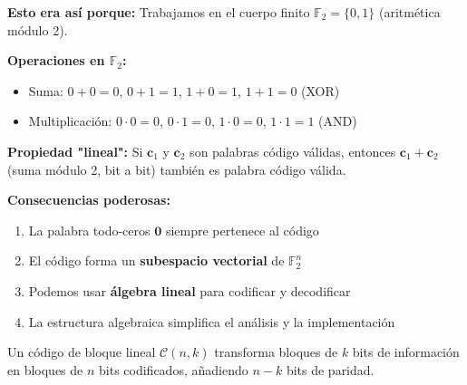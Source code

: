 \documentclass[10pt,a4paper]{article}
\begin{document}
\begin{tcolorbox}[colback=azulclaro!10,colframe=azuloscuro,title=🧠 FUNDAMENTO: ¿Por qué "lineales"?]
\textbf{Esto era así porque:} Trabajamos en el cuerpo finito $\mathbb{F}_2 = \{0,1\}$ (aritmética módulo 2).

\textbf{Operaciones en $\mathbb{F}_2$:}
\begin{itemize}
\item Suma: $0 + 0 = 0$, $0 + 1 = 1$, $1 + 0 = 1$, $1 + 1 = 0$ (XOR)
\item Multiplicación: $0 \cdot 0 = 0$, $0 \cdot 1 = 0$, $1 \cdot 0 = 0$, $1 \cdot 1 = 1$ (AND)
\end{itemize}

\textbf{Propiedad "lineal":} Si $\mathbf{c}_1$ y $\mathbf{c}_2$ son palabras código válidas, entonces $\mathbf{c}_1 + \mathbf{c}_2$ (suma módulo 2, bit a bit) también es palabra código válida.

\textbf{Consecuencias poderosas:}
\begin{enumerate}
\item La palabra todo-ceros $\mathbf{0}$ siempre pertenece al código
\item El código forma un \textbf{subespacio vectorial} de $\mathbb{F}_2^n$
\item Podemos usar \textbf{álgebra lineal} para codificar y decodificar
\item La estructura algebraica simplifica el análisis y la implementación
\end{enumerate}
\end{tcolorbox}

Un código de bloque lineal $\mathcal{C}(n,k)$ transforma bloques de $k$ bits de información en bloques de $n$ bits codificados, añadiendo $n-k$ bits de paridad.
\end{document}
